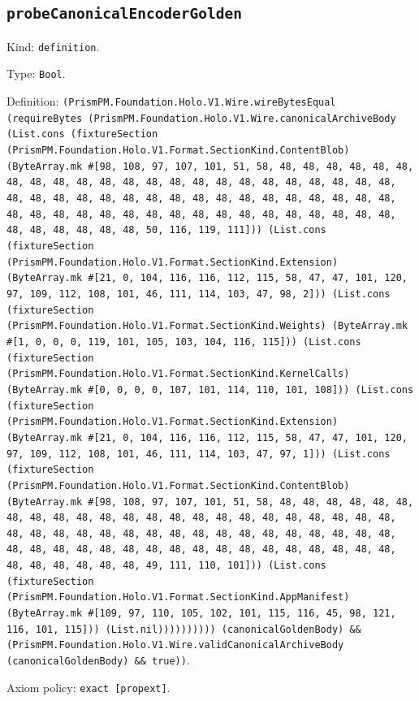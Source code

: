 \documentclass[11pt]{article}
\begin{document}
\subsection*{\texttt{probeCanonicalEncoderGolden}}
\noindent Kind: \texttt{definition}.\par
\noindent Type: \texttt{Bool}.\par
\noindent Definition: \texttt{(PrismPM.Foundation.Holo.V1.Wire.wireBytesEqual (requireBytes (PrismPM.Foundation.Holo.V1.Wire.canonicalArchiveBody (List.cons (fixtureSection (PrismPM.Foundation.Holo.V1.Format.SectionKind.ContentBlob) (ByteArray.mk \#[98, 108, 97, 107, 101, 51, 58, 48, 48, 48, 48, 48, 48, 48, 48, 48, 48, 48, 48, 48, 48, 48, 48, 48, 48, 48, 48, 48, 48, 48, 48, 48, 48, 48, 48, 48, 48, 48, 48, 48, 48, 48, 48, 48, 48, 48, 48, 48, 48, 48, 48, 48, 48, 48, 48, 48, 48, 48, 48, 48, 48, 48, 48, 48, 48, 48, 48, 48, 48, 48, 50, 116, 119, 111])) (List.cons (fixtureSection (PrismPM.Foundation.Holo.V1.Format.SectionKind.Extension) (ByteArray.mk \#[21, 0, 104, 116, 116, 112, 115, 58, 47, 47, 101, 120, 97, 109, 112, 108, 101, 46, 111, 114, 103, 47, 98, 2])) (List.cons (fixtureSection (PrismPM.Foundation.Holo.V1.Format.SectionKind.Weights) (ByteArray.mk \#[1, 0, 0, 0, 119, 101, 105, 103, 104, 116, 115])) (List.cons (fixtureSection (PrismPM.Foundation.Holo.V1.Format.SectionKind.KernelCalls) (ByteArray.mk \#[0, 0, 0, 0, 107, 101, 114, 110, 101, 108])) (List.cons (fixtureSection (PrismPM.Foundation.Holo.V1.Format.SectionKind.Extension) (ByteArray.mk \#[21, 0, 104, 116, 116, 112, 115, 58, 47, 47, 101, 120, 97, 109, 112, 108, 101, 46, 111, 114, 103, 47, 97, 1])) (List.cons (fixtureSection (PrismPM.Foundation.Holo.V1.Format.SectionKind.ContentBlob) (ByteArray.mk \#[98, 108, 97, 107, 101, 51, 58, 48, 48, 48, 48, 48, 48, 48, 48, 48, 48, 48, 48, 48, 48, 48, 48, 48, 48, 48, 48, 48, 48, 48, 48, 48, 48, 48, 48, 48, 48, 48, 48, 48, 48, 48, 48, 48, 48, 48, 48, 48, 48, 48, 48, 48, 48, 48, 48, 48, 48, 48, 48, 48, 48, 48, 48, 48, 48, 48, 48, 48, 48, 48, 49, 111, 110, 101])) (List.cons (fixtureSection (PrismPM.Foundation.Holo.V1.Format.SectionKind.AppManifest) (ByteArray.mk \#[109, 97, 110, 105, 102, 101, 115, 116, 45, 98, 121, 116, 101, 115])) (List.nil)))))))))) (canonicalGoldenBody) \&\& (PrismPM.Foundation.Holo.V1.Wire.validCanonicalArchiveBody (canonicalGoldenBody) \&\& true))}.\par
\noindent Axiom policy: \texttt{exact [propext]}.\par
\end{document}
